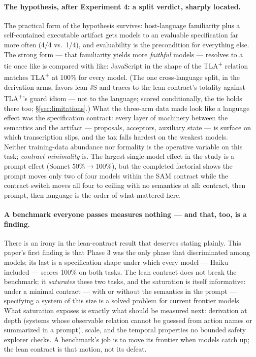 \documentclass[11pt]{article}
\newcommand{\tlaplus}{TLA\texorpdfstring{\textsuperscript{+}}{+}}
\begin{document}
\paragraph{The hypothesis, after Experiment 4: a split verdict, sharply
located.}
The practical form of the hypothesis survives: host-language familiarity plus
a self-contained executable artifact gets models to an evaluable
specification far more often (4/4 vs.\ 1/4), and evaluability is the
precondition for everything else. The strong form --- that familiarity yields
more \emph{faithful} models --- resolves to a tie once like is compared with
like: JavaScript in the shape of the \tlaplus{} relation matches \tlaplus{}
at 100\% for every model. (The one cross-language split, in the derivation
arms, favors lean JS and traces to the lean contract's totality against
\tlaplus{}'s guard idiom --- not to the language; scored conditionally, the
tie holds there too; \S\ref{sec:limitations}.) What the three-arm data made
look like a language
effect was the specification contract: every layer of machinery between the
semantics and the artifact --- proposals, acceptors, auxiliary state --- is
surface on which transcription slips, and the tax falls hardest on the
weakest models. Neither training-data abundance nor formality is the
operative variable on this task; \emph{contract minimality} is. The largest
single-model effect in the study is a prompt effect (Sonnet
50\%$\to$100\%), but the completed factorial shows the prompt moves only two
of four models within the SAM contract while the contract switch moves all
four to ceiling with no semantics at all: contract, then prompt, then
language is the order of what mattered here.

\paragraph{A benchmark everyone passes measures nothing --- and that, too,
is a finding.}
There is an irony in the lean-contract result that deserves stating
plainly. This paper's first finding is that Phase 3 was the only phase
that discriminated among models; its last is a specification shape under
which every model --- Haiku included --- scores 100\% on both tasks. The
lean contract does not break the benchmark; it \emph{saturates} these two
tasks, and the saturation is itself informative: under a minimal contract
--- with or without the semantics in the prompt --- specifying a system of
this size is a solved problem for current frontier models. What saturation
exposes is exactly what should be measured next: derivation at depth
(systems whose observable relation cannot be guessed from action names or
summarized in a prompt), scale, and the temporal properties no bounded
safety explorer checks. A benchmark's job
is to move its frontier when models catch up; the lean contract is that
motion, not its defeat.
\end{document}
